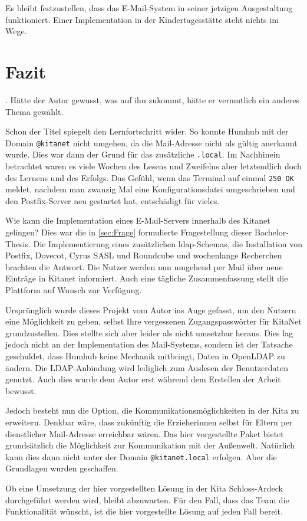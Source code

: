 Es bleibt festzustellen, dass das E-Mail-System in seiner jetzigen Ausgestaltung funktioniert. Einer Implementation in der Kindertagesstätte steht nichts im Wege.

\chapter{Fazit}
\label{sec:Fazit}

 \citep[][1109]{Kofler2020}. 
Hätte der Autor gewusst, was auf ihn zukommt, hätte er vermutlich ein anderes Thema gewählt. 

Schon der Titel spiegelt den Lernfortschritt wider. 
So konnte Humhub mit der Domain \verb+@kitanet+ nicht umgehen, da die Mail-Adresse nicht als gültig anerkannt wurde. 
Dies war dann der Grund für das zusätzliche \verb+.local+.
Im Nachhinein betrachtet waren es viele Wochen des Lesens und Zweifelns aber letztendlich doch des Lernens und des Erfolgs.
Das Gefühl, wenn das Terminal auf einmal \verb+250 OK+ meldet, nachdem man zwanzig Mal eine Konfigurationsdatei umgeschrieben und den Postfix-Server neu gestartet hat, entschädigt für vieles.

Wie kann die Implementation eines E-Mail-Servers innerhalb des Kitanet gelingen? Dies war die in \autoref{sec:Frage} formulierte Fragestellung dieser Bachelor-Thesis. 
Die Implementierung eines zusätzlichen \ac{ldap}-Schemas, die Installation von Postfix, Dovecot, Cyrus SASL und Roundcube und wochenlange Recherchen brachten die Antwort. 
Die Nutzer werden nun umgehend per Mail über neue Einträge in Kitanet informiert. Auch eine tägliche Zusammenfassung stellt die Plattform  auf Wunsch zur Verfügung.

Ursprünglich wurde dieses Projekt vom Autor ins Auge gefasst, um den Nutzern eine Möglichkeit zu geben, selbst Ihre vergessenen Zugangspasswörter für KitaNet grundzustellen.
Dies stellte sich aber leider als nicht umsetzbar heraus. 
Dies lag jedoch nicht an der Implementation des Mail-Systems, sondern ist der Tatsache geschuldet, dass Humhub keine Mechanik mitbringt, Daten in OpenLDAP zu ändern. 
Die LDAP-Anbindung wird lediglich zum Auslesen der Benutzerdaten genutzt. 
Auch dies wurde dem Autor erst während dem Erstellen der Arbeit bewusst.

Jedoch besteht nun die Option, die Kommunikationsmöglichkeiten in der Kita zu erweitern. 
Denkbar wäre, dass zukünftig die Erzieherinnen selbst für Eltern per dienstlicher Mail-Adresse erreichbar wären. 
Das hier vorgestellte Paket bietet grundsätzlich die Möglichkeit zur Kommunikation mit der Außenwelt.
Natürlich kann dies dann nicht unter der Domain \verb+@kitanet.local+ erfolgen. 
Aber die Grundlagen wurden geschaffen.

Ob eine Umsetzung der hier vorgestellten Lösung in der Kita Schloss-Ardeck durchgeführt werden wird, bleibt abzuwarten.
Für den Fall, dass das Team die Funktionalität wünscht, ist die hier vorgestellte Lösung auf jeden Fall bereit.

